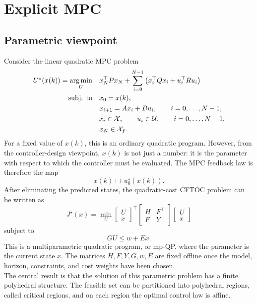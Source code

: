 \section{Explicit MPC}

\subsection{Parametric viewpoint}

Consider the linear quadratic MPC problem
\[
\begin{aligned}
    U^\star(x(k))
    =
    \operatorname*{arg\,min}_U \quad
    & x_N^\top P x_N
    +
    \sum_{i=0}^{N-1}
    \left(
        x_i^\top Q x_i + u_i^\top R u_i
    \right)
    \\
    \text{subj. to}\quad
    & x_0=x(k),
    \\
    & x_{i+1}=Ax_i+Bu_i,
    \qquad i=0,\ldots,N-1,
    \\
    & x_i\in \mathcal{X},\qquad u_i\in \mathcal{U},
    \qquad i=0,\ldots,N-1,
    \\
    & x_N\in \mathcal{X}_f .
\end{aligned}
\]
For a fixed value of \(x(k)\), this is an ordinary quadratic program. However, from the
controller-design viewpoint, \(x(k)\) is not just a number: it is the parameter with respect to
which the controller must be evaluated. The MPC feedback law is therefore the map
\[
    x(k) \mapsto u_0^\star(x(k)).
\]
After eliminating the predicted states, the quadratic-cost CFTOC problem can be written as
\[
    J^\star(x)
    =
    \min_U
    \begin{bmatrix}
        U \\ x
    \end{bmatrix}^{\!\top}
    \begin{bmatrix}
        H & F^\top \\
        F & Y
    \end{bmatrix}
    \begin{bmatrix}
        U \\ x
    \end{bmatrix}
\]
subject to
\[
    GU \leq w + Ex .
\]
This is a multiparametric quadratic program, or mp-QP, where the parameter is the current
state \(x\). The matrices \(H,F,Y,G,w,E\) are fixed offline once the model, horizon, constraints,
and cost weights have been chosen.\\

The central result is that the solution of this parametric problem has a finite polyhedral
structure. The feasible set can be partitioned into polyhedral regions, called critical regions,
and on each region the optimal control law is affine.

